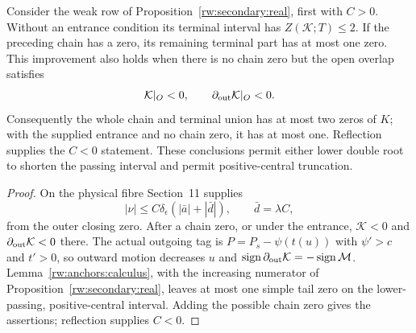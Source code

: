 \begin{proposition}
\label{rw:secondary:weak-anchor}
Consider the weak row of Proposition~\ref{rw:secondary:real},
first with $C>0$. Without an entrance condition its terminal
interval has $Z(\mathcal K;T)\le2$.
If the preceding chain has a zero, its remaining terminal part
has at most one zero. This improvement also holds when there is
no chain zero but the open overlap satisfies
\begin{equation}\label{rw:secondary:weak-signed-entry}
 \mathcal K|_O<0,\qquad \partial_{\rm out}\mathcal K|_O<0 .
\end{equation}
Consequently the whole chain and terminal union has at most two
zeros of $K$; with the supplied entrance and no chain zero,
it has at most one. Reflection supplies the $C<0$ statement.
These conclusions permit either lower double root to shorten the
passing interval and permit positive-central truncation.
\end{proposition}

\begin{proof}
On the physical fibre Section~11 supplies
\[
 |\nu|\le C\delta_\epsilon(|\bar a|+|\bar d|),\qquad
 \bar d=\lambda C,
\]
from the outer closing zero. After a chain zero, or under the entrance,
$\mathcal K<0$ and $\partial_{\rm out}\mathcal K<0$ there.
The actual outgoing tag is
$P=P_s-\psi(t(u))$ with $\psi'>c$ and $t'>0$,
so outward motion decreases $u$ and
$\operatorname{sign}\partial_{\rm out}\mathcal K
=-\operatorname{sign}\mathcal M$.
Lemma~\ref{rw:anchors:calculus}, with the increasing numerator of
Proposition~\ref{rw:secondary:real}, leaves at most one simple tail
zero on the lower-passing, positive-central interval. Adding the
possible chain zero gives the assertions; reflection supplies $C<0$.
\end{proof}
